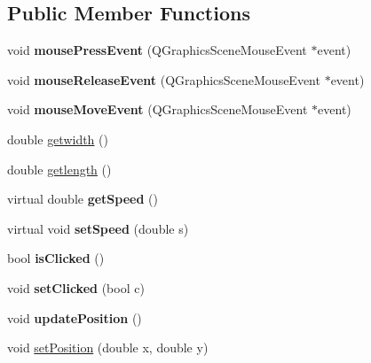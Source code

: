 \subsection*{Public Member Functions}
\begin{DoxyCompactItemize}
\item 
\mbox{\label{class_obstacle_ad99ea2e5503c0f3ae2f23ff33005ea66}} 
void {\bfseries mouse\+Press\+Event} (Q\+Graphics\+Scene\+Mouse\+Event $\ast$event)
\item 
\mbox{\label{class_obstacle_aee96980c04e985efb24934541fba293e}} 
void {\bfseries mouse\+Release\+Event} (Q\+Graphics\+Scene\+Mouse\+Event $\ast$event)
\item 
\mbox{\label{class_obstacle_a9bf186d9151a4973369a5aef75a42e61}} 
void {\bfseries mouse\+Move\+Event} (Q\+Graphics\+Scene\+Mouse\+Event $\ast$event)
\item 
double \mbox{\hyperlink{class_obstacle_a2bf33211e30b7dd9292ff23f76a7d008}{getwidth}} ()
\item 
double \mbox{\hyperlink{class_obstacle_afe853d8607d0794e44d3507c47ad5761}{getlength}} ()
\item 
\mbox{\label{class_obstacle_a340e003df47196b278dc1b3cbf66145d}} 
virtual double {\bfseries get\+Speed} ()
\item 
\mbox{\label{class_obstacle_a7025a08583ea3d3dc21778d2727fb89f}} 
virtual void {\bfseries set\+Speed} (double s)
\item 
\mbox{\label{class_obstacle_a4053849e0ecdb7b51be12e779c5dece1}} 
bool {\bfseries is\+Clicked} ()
\item 
\mbox{\label{class_obstacle_a7c0383da429b66fd9f7c28af4bb9e287}} 
void {\bfseries set\+Clicked} (bool c)
\item 
\mbox{\label{class_obstacle_a038612ebb2bf5457eb1b447849a6a9b0}} 
void {\bfseries update\+Position} ()
\item 
void \mbox{\hyperlink{class_obstacle_a601d8574fb13298bf693f0e4a2a5982f}{set\+Position}} (double x, double y)
\item 
\mbox{\label{class_obstacle_a99a30018b72dc2fdbe0641ebd9dbe7dc}} 

\end{DoxyCompactItemize}
